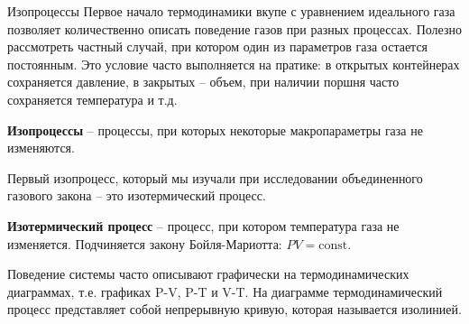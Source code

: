 \documentclass{article}
\newcommand{\definition}[2]{\begin{samepage} \textbf{#1} -- #2. \end{samepage} \par}
\newcommand{\const}{\mathrm{const}}
\begin{document}
	\begin{section}{Изопроцессы}
		Первое начало термодинамики вкупе с уравнением идеального газа позволяет количественно описать поведение газов при разных процессах. Полезно рассмотреть частный случай, при котором один из параметров газа остается постоянным. Это условие часто выполняется на пратике: в открытых контейнерах сохраняется давление, в закрытых -- объем, при наличии поршня часто сохраняется температура и т.д.

		\definition{Изопроцессы}{процессы, при которых некоторые макропараметры газа не изменяются}

		Первый изопроцесс, который мы изучали при исследовании объединенного газового закона -- это изотермический процесс.

		\definition{Изотермический процесс}{процесс, при котором температура газа не изменяется. Подчиняется закону Бойля-Мариотта: $PV = \const$}

		Поведение системы часто описывают графически на термодинамических диаграммах, т.е. графиках P-V, P-T и V-T. На диаграмме термодинамический процесс представляет собой непрерывную кривую, которая называется изолинией.

		\begin{multicols}{3}


		\end{multicols}


\end{section}
\end{document}
